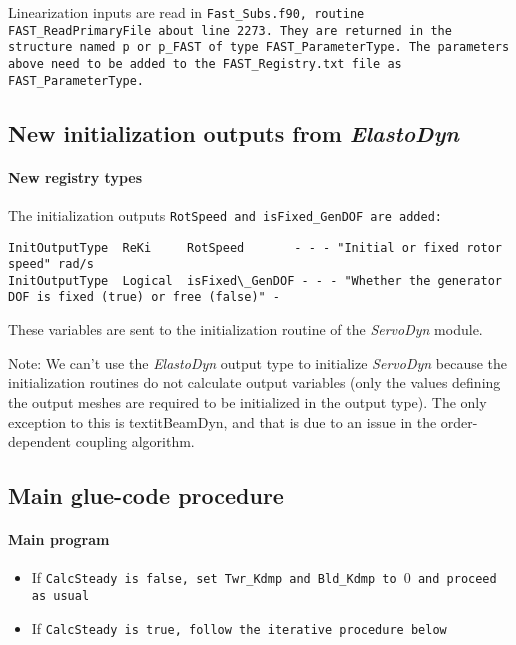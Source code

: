 \documentclass[11pt]{article}
\newcommand{\question}[1]{{\color{red}{#1}}}
\begin{document}
\question{Do we want to adjust more damping values?}
Linearization inputs are read in \tt{Fast\_Subs.f90}, routine \tt{FAST\_ReadPrimaryFile} about line 2273. They are returned in the structure named \tt{p} or \tt{p\_FAST} of type \tt{FAST\_ParameterType}. The parameters above need to be added to the \tt{FAST\_Registry.txt} file as \tt{FAST\_ParameterType}.





\subsection{New initialization outputs from \textit{ElastoDyn}}
\label{sec:newEDinitoutputs}

\paragraph{New registry types}
The initialization outputs \tt{RotSpeed} and \tt{isFixed\_GenDOF} are added: 
\fortran
\begin{lstlisting}
InitOutputType  ReKi     RotSpeed       - - - "Initial or fixed rotor speed" rad/s
InitOutputType  Logical  isFixed\_GenDOF - - - "Whether the generator DOF is fixed (true) or free (false)" -
\end{lstlisting}

These variables are sent to the initialization routine of the \textit{ServoDyn} module.

Note: We can't use the \textit{ElastoDyn} output type to initialize \textit{ServoDyn} because the 
initialization routines do not calculate output variables (only the values defining the output meshes are
required to be initialized in the output type). The only exception to this is textit{BeamDyn}, and 
that is due to an issue in the order-dependent coupling algorithm.


\subsection{Main glue-code procedure}
\label{sec:gluecodeiterative}


\paragraph{Main program}
\begin{itemize}\tightlist
    \item If \tt{CalcSteady} is false, set \tt{Twr\_Kdmp} and \tt{Bld\_Kdmp} to $0$ and proceed as usual
    \item If \tt{CalcSteady} is true, follow the iterative procedure below
\end{itemize}
\end{document}
